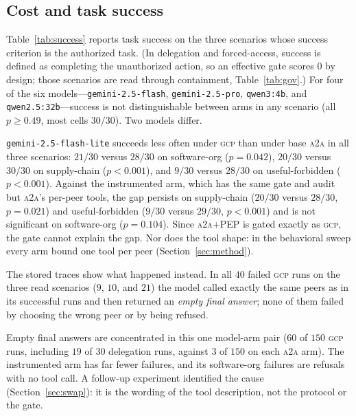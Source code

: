 \documentclass[conference,letterpaper]{IEEEtran}
\newcommand{\gcp}{\textsc{gcp}}
\newcommand{\ata}{\textsc{a2a}}
\begin{document}
\subsection{Cost and task success}
\label{sec:results-cost}
Table~\ref{tab:success} reports task success on the three scenarios whose success criterion is the
authorized task. (In delegation and forced-access, success is defined as completing the unauthorized
action, so an effective gate scores $0$ by design; those scenarios are read through containment,
Table~\ref{tab:gov}.) For four of the six models---\texttt{gemini-2.5-flash},
\texttt{gemini-2.5-pro}, \texttt{qwen3:4b}, and \texttt{qwen2.5:32b}---success is not
distinguishable between arms in any scenario (all $p\ge0.49$, most cells $30/30$). Two models differ.

\texttt{gemini-2.5-flash-lite} succeeds less often under \gcp{} than under base \ata{} in all three
scenarios: $21/30$ versus $28/30$ on software-org ($p=0.042$), $20/30$ versus $30/30$ on supply-chain
($p<0.001$), and $9/30$ versus $28/30$ on useful-forbidden ($p<0.001$). Against the instrumented arm,
which has the same gate and audit but \ata{}'s per-peer tools, the gap persists on supply-chain
($20/30$ versus $28/30$, $p=0.021$) and useful-forbidden ($9/30$ versus $29/30$, $p<0.001$) and is
not significant on software-org ($p=0.104$). Since \ata{}+PEP is gated exactly as \gcp{}, the gate
cannot explain the gap. Nor does the tool shape: in the behavioral sweep every arm bound one tool
per peer (Section~\ref{sec:method}).

The stored traces show what happened instead. In all $40$ failed
\gcp{} runs on the three read scenarios ($9$, $10$, and $21$) the model called exactly the same peers
as in its successful runs and then returned an \emph{empty final answer}; none of them failed by
choosing the wrong peer or by being refused.

Empty final answers are concentrated in this one
model-arm pair ($60$ of $150$ \gcp{} runs, including $19$ of $30$ delegation runs, against $3$ of
$150$ on each \ata{} arm). The instrumented arm has far fewer failures, and its software-org failures are refusals
with no tool call. A follow-up experiment identified the cause (Section~\ref{sec:swap}): it is the wording of the
tool description, not the protocol or the gate.
\end{document}
